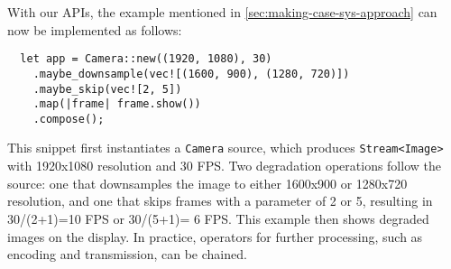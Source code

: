 With our APIs, the example mentioned in \autoref{sec:making-case-sys-approach}
can now be implemented as follows:

\vspace{-2pt}
\begin{lstlisting}
  let app = Camera::new((1920, 1080), 30)
    .maybe_downsample(vec![(1600, 900), (1280, 720)])
    .maybe_skip(vec![2, 5])
    .map(|frame| frame.show())
    .compose();
\end{lstlisting}

This snippet first instantiates a \texttt{Camera} source, which produces
\texttt{Stream<Image>} with 1920x1080 resolution and 30 FPS\@. Two degradation
operations follow the source: one that downsamples the image to either 1600x900 or
1280x720 resolution, and one that skips frames with a parameter of 2 or 5, resulting
in 30/(2+1)=10 FPS or 30/(5+1)= 6 FPS\@. This example then shows degraded images
on the display. In practice, operators for further processing, such as encoding and
transmission, can be chained.

